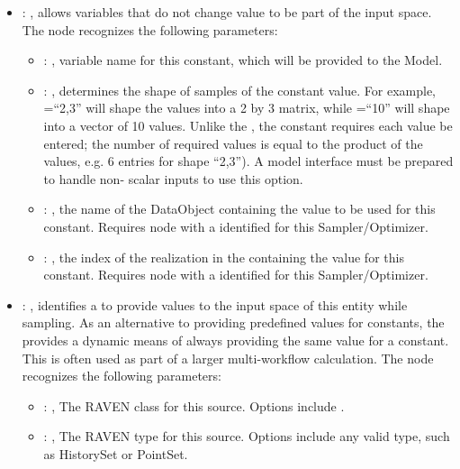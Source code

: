 \begin{itemize}
    \item {}: ,
      allows variables that do not change value to be part of the input space.
      The  node recognizes the following parameters:
        \begin{itemize}
          \item {}: ,
            variable name for this constant, which will be provided to the Model.
          \item {}: ,
            determines the shape of samples of the constant value.               For example,
            =``2,3'' will shape the values into a 2 by 3               matrix, while
            =``10'' will shape into a vector of 10 values.               Unlike the
            , the constant requires each value be entered; the number
            of required values is equal to the product of the  values, e.g. 6 entries
            for shape ``2,3'').               \nb A model interface must be prepared to handle non-
            scalar inputs to use this option.
          \item {}: ,
            the name of the DataObject containing the value to be used for this constant.
            Requires  node with a  identified for this
            Sampler/Optimizer.
          \item {}: ,
            the index of the realization in the  
            containing the value for this constant. Requires  node with
            a  identified for this Sampler/Optimizer.
      \end{itemize}

    \item {}: ,
      identifies a  to provide  values to the input
      space of this entity while sampling. As an alternative to providing predefined values
      for constants, the  provides a dynamic means of always providing
      the same value for a constant. This is often used as part of a larger multi-workflow
      calculation.
      The  node recognizes the following parameters:
        \begin{itemize}
          \item {}: ,
            The RAVEN class for this source. Options include .
          \item {}: ,
            The RAVEN type for this source. Options include any valid  type,
            such as HistorySet or PointSet.
      \end{itemize}


\end{itemize}
